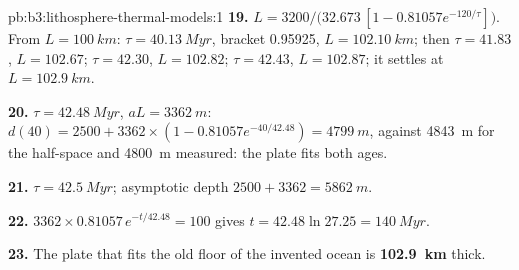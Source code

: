 \begin{solution}{pb:b3:lithosphere-thermal-models:1}
\textbf{19.} $L = 3200/\bigl(32.673\,[1 - 0.81057e^{-120/\tau}]\bigr)$. From
$L = \qty{100}{km}$: $\tau = \qty{40.13}{Myr}$, bracket 0.95925, $L =
\qty{102.10}{km}$; then $\tau = 41.83$, $L = 102.67$; $\tau = 42.30$, $L =
102.82$; $\tau = 42.43$, $L = 102.87$; it settles at $L = \qty{102.9}{km}$.

\textbf{20.} $\tau = \qty{42.48}{Myr}$, $aL = \qty{3362}{m}$: $d(40) = 2500 +
3362\times(1 - 0.81057e^{-40/42.48}) = \qty{4799}{m}$, against \qty{4843}{m}
for the half-space and \qty{4800}{m} measured: the plate fits both ages.

\textbf{21.} $\tau = \qty{42.5}{Myr}$; asymptotic depth $2500 + 3362 =
\qty{5862}{m}$.

\textbf{22.} $3362\times0.81057\,e^{-t/42.48} = 100$ gives $t = 42.48\ln27.25 =
\qty{140}{Myr}$.

\textbf{23.} The plate that fits the old floor of the invented ocean is
\textbf{\qty[text-series-to-math=true]{102.9}{km}} thick.
\end{solution}
